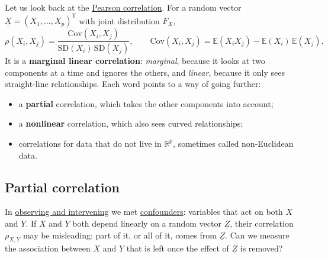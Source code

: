 \documentclass[a4paper,12pt,oneside]{report}
\begin{document}
Let us look back at the \hyperref[def:correlation]{Pearson correlation}.
For a random vector $\underline{X}=(X_1,\ldots,X_p)^{\mathsf T}$ with
joint distribution $F_{\underline{X}}$,
\[
\rho(X_i,X_j)=\frac{\mathrm{Cov}(X_i,X_j)}{\mathrm{SD}(X_i)\,\mathrm{SD}(X_j)},
\qquad
\mathrm{Cov}(X_i,X_j)=\mathbb{E}(X_iX_j)-\mathbb{E}(X_i)\,\mathbb{E}(X_j).
\]
It is a \textbf{marginal linear correlation}: \emph{marginal}, because it
looks at two components at a time and ignores the others, and
\emph{linear}, because it only sees straight-line relationships. Each word
points to a way of going further:
\begin{itemize}
\item a \textbf{partial} correlation, which takes the other components
into account;
\item a \textbf{nonlinear} correlation, which also sees curved
relationships;
\item correlations for data that do not live in $\mathbb{R}^p$, sometimes
called non-Euclidean data.
\end{itemize}

\subsection{Partial correlation}\label{sec:partial-correlation}

In \hyperref[sec:causation]{observing and intervening} we met
\hyperref[ex:covid-5g]{confounders}: variables that act on both $X$ and
$Y$. If $X$ and $Y$ both depend linearly on a random vector
$\underline{Z}$, their correlation $\rho_{X,Y}$ may be misleading: part of
it, or all of it, comes from $\underline{Z}$. Can we measure the
association between $X$ and $Y$ that is left once the effect of
$\underline{Z}$ is removed?
\end{document}
